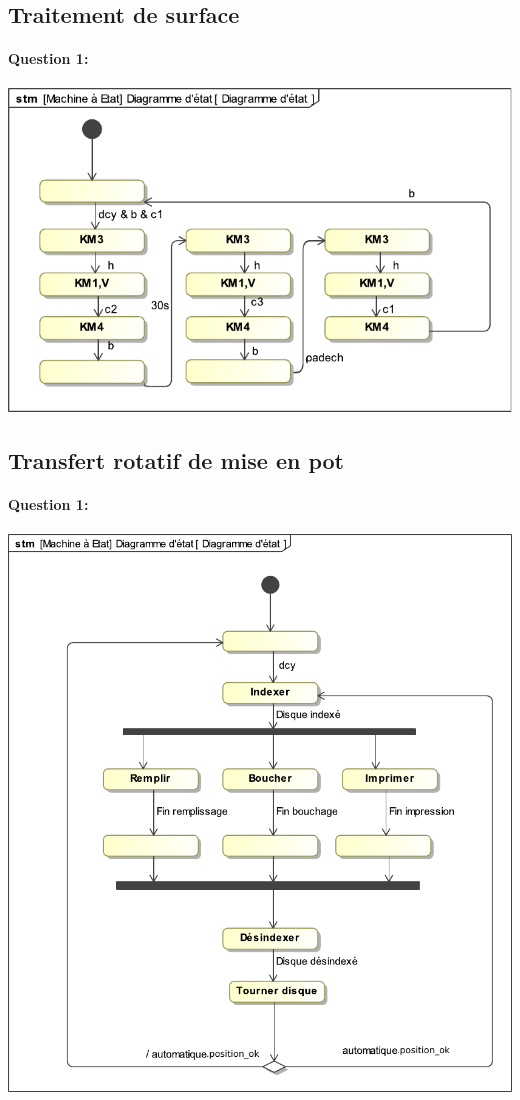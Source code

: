 \subsection{Traitement de surface}

\paragraph{Question 1:}

\begin{center}
 \includegraphics[width=0.7\linewidth]{img/traitement_cor}
\end{center}

\subsection{Transfert rotatif de mise en pot}

\paragraph{Question 1:}

\begin{center}
 \includegraphics[width=0.7\linewidth]{img/remplir_pot_cor}
\end{center}


